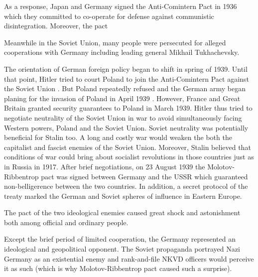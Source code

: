 As a response, Japan and Germany signed the Anti-Comintern Pact in 1936 which they committed to  co-operate for defense against communistic disintegration. Moreover, the pact 

Meanwhile in the Soviet Union, many people were persecuted for alleged cooperations with Germany including leading general Mikhail Tukhachevsky. 

The orientation of German foreign policy began to shift in spring of 1939.
Until that point, Hitler tried to court Poland to join the Anti-Comintern Pact against the Soviet Union \citep[chapter 26]{weinberg_hitlers_2010}. 
But Poland repeatedly refused and the German army began planing for the invasion of Poland in April 1939 \citep[p. 621]{kotkin_stalin:_2017}. However, France and Great Britain granted security guarantees to Poland in March 1939. 
Hitler thus tried to negotiate neutrality of the Soviet Union in war to avoid simultaneously facing  Western powers, Poland and the Soviet Union.
Soviet neutrality was potentially beneficial for Stalin too. A long and 
costly war would weaken the both the capitalist and fascist enemies of the 
Soviet Union. Moreover, Stalin believed that conditions of war could bring 
about socialist revolutions in those countries just as in Russia in 1917.  
After brief negotiations, on 23 August 1939   the  Molotov-Ribbentrop pact 
was signed between Germany and the USSR which guaranteed non-belligerence 
between the two countries. In addition,  a secret protocol of the treaty marked the German and Soviet spheres of influence in Eastern Europe.

The pact of the two ideological enemies caused great shock and astonishment both among official and ordinary people. 



Except the brief period of limited cooperation, the Germany represented an ideological and geopolitical opponent. The Soviet propaganda portrayed Nazi
Germany as an existential enemy and rank-and-file NKVD officers would
perceive it as such (which is why Molotov-Ribbentrop pact caused such a surprise). \citep{kotkin_stalin:_2017}

